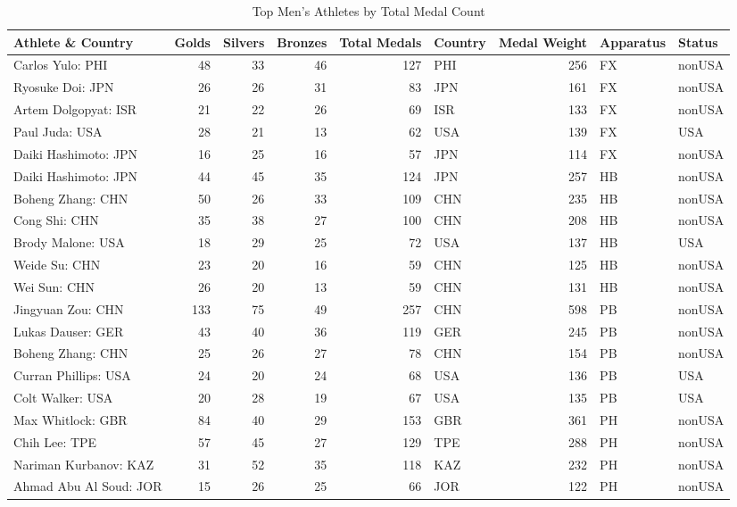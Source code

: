 \documentclass[
  10.5pt,
  letterpaper,
  DIV=11,
  numbers=noendperiod]{scrartcl}
\begin{document}
\begin{table}[H]

\caption{Top Men's Athletes by Total Medal Count}
\centering
\fontsize{8}{10}\selectfont
\begin{tabular}[t]{l|r|r|r|r|l|r|l|l}
\hline
Athlete \& Country & Golds & Silvers & Bronzes & Total Medals & Country & Medal Weight & Apparatus & Status\\
\hline
Carlos Yulo: PHI & 48 & 33 & 46 & 127 & PHI & 256 & FX & nonUSA\\
\hline
Ryosuke Doi: JPN & 26 & 26 & 31 & 83 & JPN & 161 & FX & nonUSA\\
\hline
Artem Dolgopyat: ISR & 21 & 22 & 26 & 69 & ISR & 133 & FX & nonUSA\\
\hline
Paul Juda: USA & 28 & 21 & 13 & 62 & USA & 139 & FX & USA\\
\hline
Daiki Hashimoto: JPN & 16 & 25 & 16 & 57 & JPN & 114 & FX & nonUSA\\
\hline
Daiki Hashimoto: JPN & 44 & 45 & 35 & 124 & JPN & 257 & HB & nonUSA\\
\hline
Boheng Zhang: CHN & 50 & 26 & 33 & 109 & CHN & 235 & HB & nonUSA\\
\hline
Cong Shi: CHN & 35 & 38 & 27 & 100 & CHN & 208 & HB & nonUSA\\
\hline
Brody Malone: USA & 18 & 29 & 25 & 72 & USA & 137 & HB & USA\\
\hline
Weide Su: CHN & 23 & 20 & 16 & 59 & CHN & 125 & HB & nonUSA\\
\hline
Wei Sun: CHN & 26 & 20 & 13 & 59 & CHN & 131 & HB & nonUSA\\
\hline
Jingyuan Zou: CHN & 133 & 75 & 49 & 257 & CHN & 598 & PB & nonUSA\\
\hline
Lukas Dauser: GER & 43 & 40 & 36 & 119 & GER & 245 & PB & nonUSA\\
\hline
Boheng Zhang: CHN & 25 & 26 & 27 & 78 & CHN & 154 & PB & nonUSA\\
\hline
Curran Phillips: USA & 24 & 20 & 24 & 68 & USA & 136 & PB & USA\\
\hline
Colt Walker: USA & 20 & 28 & 19 & 67 & USA & 135 & PB & USA\\
\hline
Max Whitlock: GBR & 84 & 40 & 29 & 153 & GBR & 361 & PH & nonUSA\\
\hline
Chih Lee: TPE & 57 & 45 & 27 & 129 & TPE & 288 & PH & nonUSA\\
\hline
Nariman Kurbanov: KAZ & 31 & 52 & 35 & 118 & KAZ & 232 & PH & nonUSA\\
\hline
Ahmad Abu Al Soud: JOR & 15 & 26 & 25 & 66 & JOR & 122 & PH & nonUSA\\

\end{tabular}
\end{table}
\end{document}
